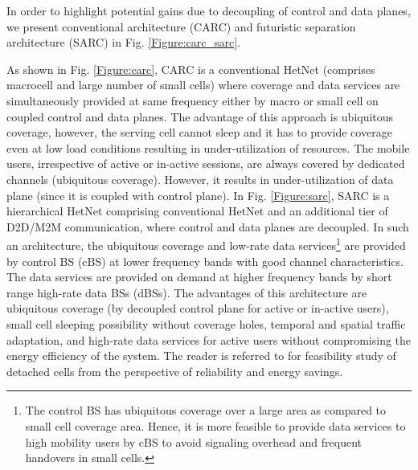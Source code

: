 \documentclass[article,10pt,twocolumn]{IEEEtran}
\begin{document}
In order to highlight potential gains due to decoupling of control and data planes, we present conventional architecture (CARC) and futuristic separation architecture (SARC) in Fig. \ref{Figure:carc_sarc}.
\begin{figure*}[!htb]
\centering
 \caption{Conventional and control/data plane separation architecture.}
   \vspace{-3mm}
\label{Figure:carc_sarc}
\end{figure*}
As shown in Fig. \ref{Figure:carc}, CARC is a conventional HetNet (comprises macrocell and large number of small cells) where coverage and data services are simultaneously provided at same frequency either by macro or small cell on coupled control and data planes. The advantage of this approach is ubiquitous coverage, however, the serving cell cannot sleep and it has to provide coverage even at low load conditions resulting in under-utilization of resources. The mobile users, irrespective of active or in-active sessions, are always covered by dedicated channels (ubiquitous coverage). However, it results in under-utilization of data plane (since it is coupled with control plane). In Fig. \ref{Figure:sarc}, SARC is a hierarchical HetNet comprising conventional HetNet and an additional tier of D2D/M2M communication, where control and data planes are decoupled. In such an architecture, the ubiquitous coverage and low-rate data services\footnote{The control BS has ubiquitous coverage over a large area as compared to small cell coverage area. Hence, it is more feasible to provide data services to high mobility users by cBS to avoid signaling overhead and frequent handovers in small cells.} are provided by control BS (cBS) at lower frequency bands with good channel characteristics. The data services are provided on demand at higher frequency bands by short range high-rate data BSs (dBSs). The advantages of this architecture are ubiquitous coverage (by decoupled control plane for active or in-active users), small cell sleeping possibility without coverage holes, temporal and spatial traffic adaptation, and high-rate data services for active users without compromising the energy efficiency of the system. The reader is referred to \citep{6468982} for feasibility study of detached cells from the perspective of reliability and energy savings.
\end{document}
